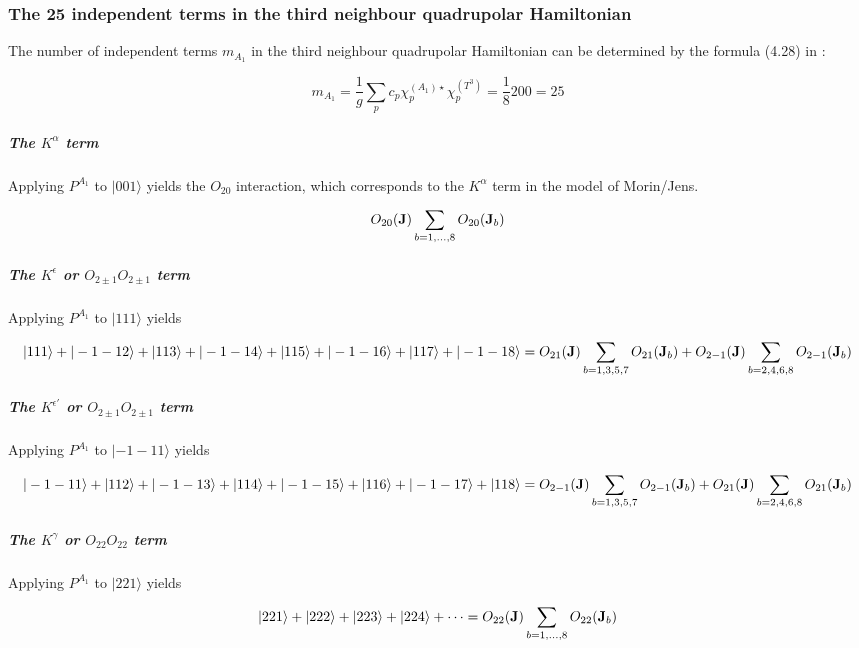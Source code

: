 \subsubsection{The 25 independent terms in the third neighbour quadrupolar Hamiltonian}\label{25ind}

The number of independent terms $m_{A_1}$ in the third neighbour quadrupolar Hamiltonian can be
determined by the formula (4.28) in \cite{elliott79-1}:

\begin{equation}
m_{A_1}=\frac{1}{g}\sum_p c_p \chi^{(A_1)\star}_p \chi^{(T^3)}_p = \frac{1}{8} 200=25
\end{equation}

\subparagraph{The $K^{\alpha}$ term}

Applying $P^{A_1}$ to $|001\rangle$ yields the $O_{20}$ interaction, which
corresponds to the $K^{\alpha}$ term in the model of Morin/Jens.

\begin{equation}
O_{20}(\mathbf J)\sum_{b=1,\dots,8}O_{20}(\mathbf J_b)
\end{equation}

\subparagraph{The $K^{\epsilon}$ or $O_{2\pm1}O_{2\pm1}$ term}

Applying $P^{A_1}$ to $|111\rangle$ yields 

\begin{equation}
|111\rangle+|-1-12\rangle+|113\rangle+|-1-14\rangle+
|115\rangle+|-1-16\rangle+|117\rangle+|-1-18\rangle=
O_{21}(\mathbf J)\sum_{b=1,3,5,7} O_{21}(\mathbf J_b)+O_{2-1}(\mathbf J)\sum_{b=2,4,6,8}O_{2-1}(\mathbf J_b)
\end{equation}

\subparagraph{The $K^{\epsilon'}$ or $O_{2\pm1}O_{2\pm1}$ term}

Applying $P^{A_1}$ to $|-1-11\rangle$ yields 

\begin{equation}
|-1-11\rangle+|112\rangle+|-1-13\rangle+|114\rangle +
|-1-15\rangle+|116\rangle+|-1-17\rangle+|118\rangle =
O_{2-1}(\mathbf J)\sum_{b=1,3,5,7} O_{2-1}(\mathbf J_b)+O_{21}(\mathbf J)\sum_{b=2,4,6,8}O_{21}(\mathbf J_b)
\end{equation}


\subparagraph{The $K^{\gamma}$ or $O_{22}O_{22}$ term}

Applying $P^{A_1}$ to $|221\rangle$ yields 

\begin{equation}
|221\rangle+|222\rangle+|223\rangle+|224\rangle + \dots =
O_{22}(\mathbf J)\sum_{b=1,\dots,8}O_{22}(\mathbf J_b)
\end{equation}


